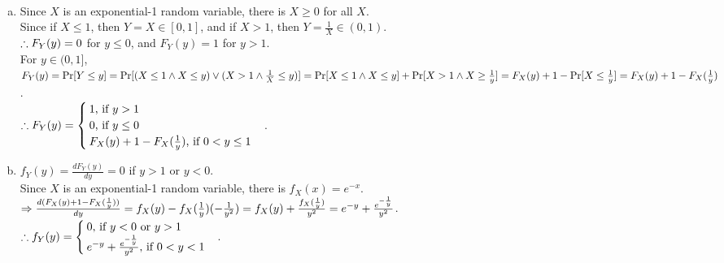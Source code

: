 \begin{pr}$ $
\begin{enumerate}[(a)]
\item Since $X$ is an exponential-1 random variable, there is $X\geq0$ for all $X$.\\
Since if $X\leq1$, then $Y=X\in[0, 1]$, and if $X>1$, then $Y=\frac1X\in(0, 1)$.\\
$\so F_Y(y)=0$ for $y\leq0$, and $F_Y(y)=1$ for $y>1$.\\
For $y\in(0, 1]$, $F_Y(y)=\P[Y\leq y]=\P[(X\leq1\land X\leq y)\lor(X>1\land\frac1X\leq y)]=\P[X\leq1\land X\leq y]+\P[X>1\land X\geq\frac1y]=F_X(y)+1-\P[X\leq\frac1y]=F_X(y)+1-F_X(\frac1y)$.\\
$\so F_Y(y)=\begin{cases}
1\text{, if }y>1\\
0\text{, if }y\leq0\\
F_X(y)+1-F_X(\frac1y)\text{, if }0<y\leq1
\end{cases}$.
\item $f_Y(y)=\frac{dF_Y(y)}{dy}=0$ if $y>1$ or $y<0$.\\
Since $X$ is an exponential-1 random variable, there is $f_X(x)=e^{-x}$.\\
$\then\frac{d(F_X(y)+1-F_X(\frac1y))}{dy}=f_X(y)-f_X(\frac1y)(-\frac1{y^2})=f_X(y)+\frac{f_X(\frac1y)}{y^2}=e^{-y}+\frac{e^{-\frac1y}}{y^2}$.\\
$\so f_Y(y)=\begin{cases}
0\text{, if }y<0\text{ or }y>1\\
e^{-y}+\frac{e^{-\frac1y}}{y^2}\text{, if }0<y<1
\end{cases}$.
\end{enumerate}
\end{pr}

